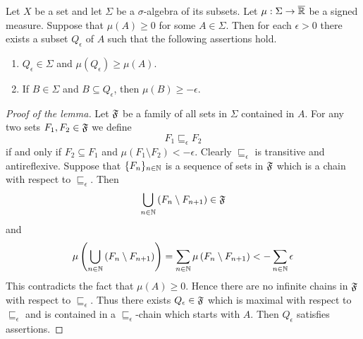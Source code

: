 \begin{lemma}\label{lemma:approximate_positive_set}
    Let $X$ be a set and let $\Sigma$ be a $\sigma$-algebra of its subsets. Let $\mu:\Sigma \rightarrow \overline{{\mathbb R}}$ be a signed measure. Suppose that $\mu(A) \geq 0$ for some $A \in \Sigma$. Then for each $\epsilon > 0$ there exists a subset $Q_{\epsilon}$ of $A$ such that the following assertions hold.
    \begin{enumerate}[label=\emph{\textbf{(\arabic*)}}, leftmargin=3.0em]
        \item $Q_{\epsilon} \in \Sigma$ and $\mu(Q_{\epsilon}) \geq \mu(A)$.
        \item If $B \in \Sigma$ and $B \subseteq Q_{\epsilon}$, then $\mu(B) \geq -\epsilon$.
    \end{enumerate}
\end{lemma}
\begin{proof}[Proof of the lemma]
    Let ${\mathfrak F}$ be a family of all sets in $\Sigma$ contained in $A$. For any two sets $F_1,F_2\in {\mathfrak F}$ we define
    $$F_1 \sqsubseteq_{\epsilon}F_2$$
    if and only if $F_2 \subseteq F_1$ and $\mu(F_1 \setminus F_2) < -\epsilon$. Clearly $\sqsubseteq_{\epsilon}$ is transitive and antireflexive. Suppose that $\{F_n\}_{n\in {\mathbb N}}$ is a sequence of sets in ${\mathfrak F}$ which is a chain with respect to $\sqsubseteq_{\epsilon}$. Then
    $$\bigcup_{n\in {\mathbb N}}\left(F_n\setminus F_{n+1}\right) \in {\mathfrak F}$$
    and
    $$\mu\left(\bigcup_{n\in {\mathbb N}}\left(F_n\setminus F_{n+1}\right)\right) = \sum_{n\in {\mathbb N}}\mu\left(F_n\setminus F_{n+1}\right) < -\sum_{n\in {\mathbb N}}\epsilon$$
    This contradicts the fact that $\mu(A) \geq 0$. Hence there are no infinite chains in ${\mathfrak F}$ with respect to $\sqsubseteq_{\epsilon}$. Thus there exists $Q_{\epsilon} \in {\mathfrak F}$ which is maximal with respect to $\sqsubseteq_{\epsilon}$ and is contained in a $\sqsubseteq_{\epsilon}$-chain which starts with $A$. Then $Q_{\epsilon}$ satisfies assertions.
\end{proof}

